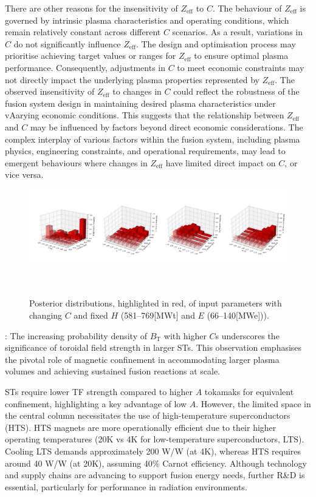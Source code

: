 \documentclass[journal]{IEEEtran}
\begin{document}
There are other reasons for the insensitivity of $Z_{\text{eff}}$ to $C$. The behaviour of $Z_{\text{eff}}$ is governed by intrinsic plasma characteristics and operating conditions, which remain relatively constant across different $C$ scenarios. As a result, variations in $C$ do not significantly influence $Z_{\text{eff}}$. The design and optimisation process may prioritise achieving target values or ranges for $Z_{\text{eff}}$ to ensure optimal plasma performance. Consequently, adjustments in $C$ to meet economic constraints may not directly impact the underlying plasma properties represented by $Z_{\text{eff}}$. The observed insensitivity of $Z_{\text{eff}}$ to changes in $C$ could reflect the robustness of the fusion system design in maintaining desired plasma characteristics under vAarying economic conditions. This suggests that the relationship between $Z_{\text{eff}}$ and $C$ may be influenced by factors beyond direct economic considerations. The complex interplay of various factors within the fusion system, including plasma physics, engineering constraints, and operational requirements, may lead to emergent behaviours where changes in $Z_{\text{eff}}$ have limited direct impact on $C$, or vice versa.

\begin{figure}[ht]
    \centering
    \includegraphics[width=\textwidth]{figures/TE_results/march_data/3D_posteriors.png}
    \caption{\small Posterior distributions, highlighted in red, of input parameters with changing $C$ and fixed $H$ (581--769[MWt] and $E$ (66--140[MWe])).}~\label{fig:posterior_planes3}
\end{figure}

: The increasing probability density of $B_{\text{T}}$ with higher $C$s underscores the significance of toroidal field strength in larger STs. This observation emphasises the pivotal role of magnetic confinement in accommodating larger plasma volumes and achieving sustained fusion reactions at scale. 

STs require lower TF strength compared to higher $A$ tokamaks for equivalent confinement, highlighting a key advantage of low $A$. However, the limited space in the central column necessitates the use of high-temperature superconductors (HTS). HTS magnets are more operationally efficient due to their higher operating temperatures (20K vs 4K for low-temperature superconductors, LTS). Cooling LTS demands approximately 200 W/W (at 4K), whereas HTS requires around 40 W/W (at 20K), assuming 40\% Carnot efficiency. Although technology and supply chains are advancing to support fusion energy needs, further R\&D is essential, particularly for performance in radiation environments.
\end{document}
